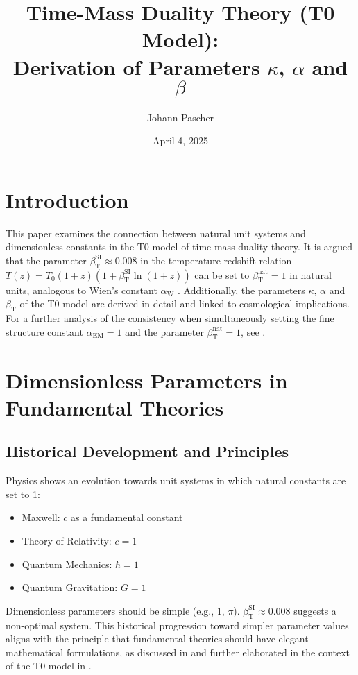\documentclass[12pt,a4paper]{article}
\newcommand{\alphaEM}{\alpha_{\text{EM}}}
\newcommand{\betaT}{\beta_{\text{T}}}
\newcommand{\alphaW}{\alpha_{\text{W}}}
\begin{document}
	
	\title{Time-Mass Duality Theory (T0 Model): \\ Derivation of Parameters \(\kappa\), \(\alpha\) and \(\beta\)}
	\author{Johann Pascher}
	\date{April 4, 2025}
	
	\maketitle
	
	\section*{Introduction}
	\label{sec:introduction}
	
	This paper examines the connection between natural unit systems and dimensionless constants in the T0 model of time-mass duality theory. It is argued that the parameter \(\betaT^{\text{SI}} \approx 0.008\) in the temperature-redshift relation \(T(z) = T_0 (1+z)(1+\betaT^{\text{SI}}\ln(1+z))\) can be set to \(\betaT^{\text{nat}} = 1\) in natural units, analogous to Wien's constant \(\alphaW\) \cite{pascher_temp_2025}. Additionally, the parameters \(\kappa\), \(\alpha\) and \(\betaT\) of the T0 model are derived in detail and linked to cosmological implications. For a further analysis of the consistency when simultaneously setting the fine structure constant \(\alphaEM = 1\) and the parameter \(\betaT^{\text{nat}} = 1\), see \cite{pascher_alphabeta_2025}.
	
	\tableofcontents
	\newpage
	
	\section{Dimensionless Parameters in Fundamental Theories}
	\label{sec:dimensionless_params}
	
	\subsection{Historical Development and Principles}
	\label{subsec:historical_development}
	
	Physics shows an evolution towards unit systems in which natural constants are set to 1:
	\begin{itemize}
		\item Maxwell: \(c\) as a fundamental constant
		\item Theory of Relativity: \(c = 1\)
		\item Quantum Mechanics: \(\hbar = 1\)
		\item Quantum Gravitation: \(G = 1\)
	\end{itemize}
	Dimensionless parameters should be simple (e.g., 1, \(\pi\)). \(\betaT^{\text{SI}} \approx 0.008\) suggests a non-optimal system. This historical progression toward simpler parameter values aligns with the principle that fundamental theories should have elegant mathematical formulations, as discussed in \cite{Duff2002} and further elaborated in the context of the T0 model in \cite{pascher_alpha_2025}.
	
\end{document}

